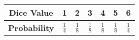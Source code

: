 \begin{tabular}{|c|c|c|c|c|c|c|}
        \hline
        \textbf{Dice Value} & 1 & 2 & 3 & 4 & 5 & 6 \\
        \hline
        \textbf{Probability} & $\frac{1}{4}$ & $\frac{1}{8}$ & $\frac{1}{8}$ & $\frac{1}{8}$ & $\frac{1}{8}$ & $\frac{1}{4}$ \\
        \hline
\end{tabular}
